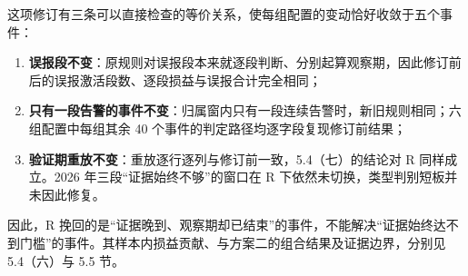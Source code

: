 \documentclass[12pt,a4paper]{ctexart}
\begin{document}
这项修订有三条可以直接检查的等价关系，使每组配置的变动恰好收敛于五个事件：
\begin{enumerate}
\item \textbf{误报段不变}：原规则对误报段本来就逐段判断、分别起算观察期，因此修订前后的误报激活段数、逐段损益与误报合计完全相同；
\item \textbf{只有一段告警的事件不变}：归属窗内只有一段连续告警时，新旧规则相同；六组配置中每组其余 40 个事件的判定路径均逐字段复现修订前结果；
\item \textbf{验证期重放不变}：重放逐行逐列与修订前一致，5.4（七）的结论对 R 同样成立。2026 年三段“证据始终不够”的窗口在 R 下依然未切换，类型判别短板并未因此修复。
\end{enumerate}
因此，R 挽回的是“证据晚到、观察期却已结束”的事件，不能解决“证据始终达不到门槛”的事件。其样本内损益贡献、与方案二的组合结果及证据边界，分别见 5.4（六）与 5.5 节。
\end{document}
